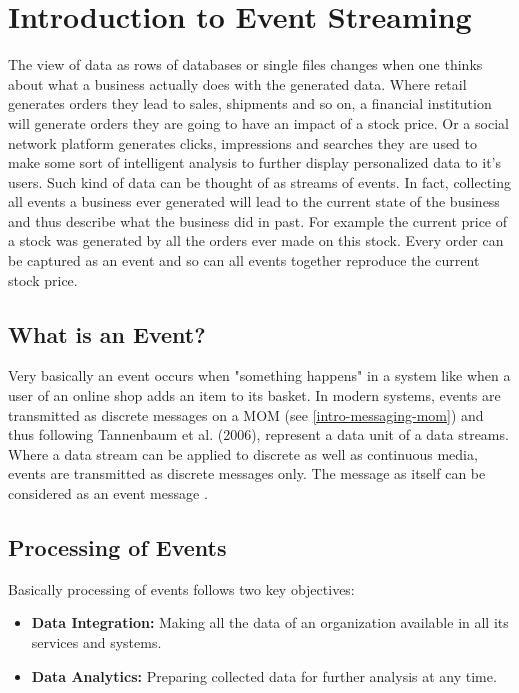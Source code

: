 \chapter{Introduction to Event Streaming}

The view of data as rows of databases or single files changes when one thinks
about what a business actually does with the generated data. Where retail
generates orders they lead to sales, shipments and so on, a financial institution will
generate orders they are going to have an impact of a stock price. Or a social
network platform generates clicks, impressions and searches they are used to
make some sort of intelligent analysis to further display personalized data to
it's users. Such kind of data can be thought of as streams of
events. In fact, collecting all events a business ever generated will lead to the current state
of the business and thus describe what the business did in past. For example the
current price of a stock was generated by all the orders ever made on this
stock. Every order can be captured as an event and so can all events together reproduce
the current stock price.

\section{What is an Event?}
\label{intro-datastream-datastream}
Very basically an event occurs when "something happens"  in a system
like when a user of an online shop adds an item to its basket. In modern systems, events are transmitted as discrete messages on a MOM (see \ref{intro-messaging-mom}) and thus
following Tannenbaum et al. (2006), represent a data unit of a data streams. 
Where a data stream can be applied to discrete as well as continuous media, events are
transmitted as discrete messages only. The message as itself can
be considered as an event message \cite{EIP03}.

\section{Processing of Events}
Basically processing of events follows two key objectives: 
\begin{itemize}
    \item \textbf{Data Integration:} Making all the data of an organization available in all its services and systems.
    \item \textbf{Data Analytics:} Preparing collected data for further analysis at any time. 
\end{itemize}

